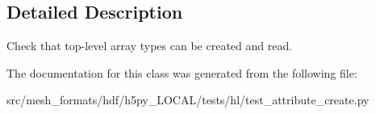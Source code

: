 \subsection{Detailed Description}
\begin{DoxyVerb}    Check that top-level array types can be created and read.
\end{DoxyVerb}
 

The documentation for this class was generated from the following file\+:\begin{DoxyCompactItemize}
\item 
src/mesh\+\_\+formats/hdf/h5py\+\_\+\+L\+O\+C\+A\+L/tests/hl/test\+\_\+attribute\+\_\+create.\+py\end{DoxyCompactItemize}
